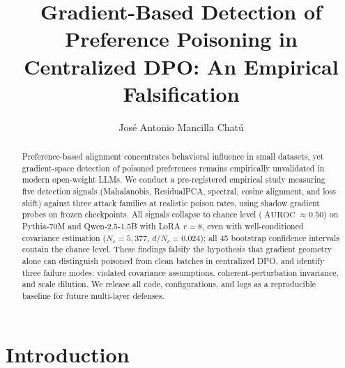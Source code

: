 \documentclass[runningheads]{llncs}
\DeclareMathOperator{\AUROC}{AUROC}
\begin{document}
\title{Gradient-Based Detection of Preference Poisoning in Centralized DPO: An Empirical Falsification}


\author{Jos\'{e} Antonio Mancilla Chat\'{u}}


\maketitle

\begin{abstract}
Preference-based alignment concentrates behavioral influence in small
datasets, yet gradient-space detection of poisoned preferences remains
empirically unvalidated in modern open-weight LLMs. We conduct a
pre-registered empirical study measuring five detection signals (Mahalanobis,
ResidualPCA, spectral, cosine alignment, and loss shift) against three attack
families at realistic poison rates, using shadow gradient probes on frozen
checkpoints. All signals collapse to chance level ($\AUROC \approx 0.50$) on
Pythia-70M and Qwen-2.5-1.5B with LoRA $r{=}8$, even with well-conditioned
covariance estimation ($N_c = 5{,}377$, $d/N_c = 0.024$); all 45 bootstrap
confidence intervals contain the chance level. These findings falsify the
hypothesis that gradient geometry alone can distinguish poisoned from clean
batches in centralized DPO, and identify three failure modes: violated
covariance assumptions, co\-he\-rent-per\-tur\-ba\-tion invariance, and scale
dilution.
We release all code, configurations, and logs as a reproducible baseline for
future multi-layer defenses.
\end{abstract}


\section{Introduction}\label{sec:intro}
\end{document}
